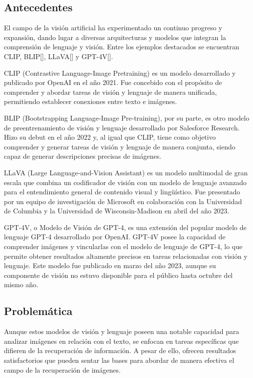 \subsection*{Antecedentes}
El campo de la visi\'on artificial ha experimentado un continuo progreso y expansi\'on, dando lugar a diversas arquitecturas y modelos que integran la comprensi\'on de lenguaje y visi\'on. Entre los ejemplos destacados se encuentran CLIP, BLIP[\cite{blip}], LLaVA[\cite{llava}] y GPT-4V[\cite{gpt-4v}].

CLIP (Contrastive Language-Image Pretraining) es un modelo desarrollado y publicado por OpenAI en el a\~no 2021. Fue concebido con el prop\'osito de comprender y abordar tareas de visi\'on y lenguaje de manera unificada, permitiendo establecer conexiones entre texto e im\'agenes.

BLIP (Bootstrapping Language-Image Pre-training), por su parte, es otro modelo de preentrenamiento de visi\'on y lenguaje desarrollado por Salesforce Research. Hizo su debut en el a\~no 2022 y, al igual que CLIP, tiene como objetivo comprender y generar tareas de visi\'on y lenguaje de manera conjunta, siendo capaz de generar descripciones precisas de im\'agenes.

LLaVA (Large Language-and-Vision Assistant) es un modelo multimodal de gran escala que combina un codificador de visi\'on con un modelo de lenguaje avanzado para el entendimiento general de contenido visual y lingü\'istico. Fue presentado por un equipo de investigaci\'on de Microsoft en colaboraci\'on con la Universidad de Columbia y la Universidad de Wisconsin-Madison en abril del a\~no 2023.

GPT-4V, o Modelo de Visi\'on de GPT-4, es una extensi\'on del popular modelo de lenguaje GPT-4 desarrollado por OpenAI. GPT-4V posee la capacidad de comprender im\'agenes y vincularlas con el modelo de lenguaje de GPT-4, lo que permite obtener resultados altamente precisos en tareas relacionadas con visi\'on y lenguaje. Este modelo fue publicado en marzo del a\~no 2023, aunque su componente de visi\'on no estuvo disponible para el p\'ublico hasta octubre del mismo a\~no.

\subsection*{Problem\'atica}
Aunque estos modelos de visi\'on y lenguaje poseen una notable capacidad para analizar im\'agenes en relaci\'on con el texto, se enfocan en tareas espec\'ificas que difieren de la recuperaci\'on de informaci\'on. A pesar de ello, ofrecen resultados satisfactorios que pueden sentar las bases para abordar de manera efectiva el campo de la recuperaci\'on de im\'agenes.

